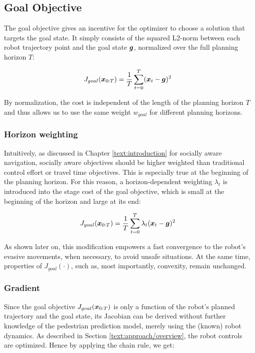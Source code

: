 \subsection{Goal Objective}
\label{text:approach/objective/goal}
The goal objective gives an incentive for the optimizer to choose a solution that targets the goal state. It simply consists of the squared L2-norm between each robot trajectory point and the goal state $\boldsymbol{g}$, normalized over the full planning horizon $T$:

\begin{equation}
J_{goal}(\boldsymbol{x}_{0:T}) = \frac{1}{T} \sum_{t = 0}^T (\boldsymbol{x}_t - \boldsymbol{g})^2
\label{eq:goal_unweighted}
\end{equation}

By normalization, the cost is independent of the length of the planning horizon $T$ and thus allows us to use the same weight $w_{goal}$ for different planning horizons.

\subsubsection{Horizon weighting}
Intuitively, as discussed in Chapter \ref{text:introduction} for socially aware navigation, socially aware objectives should be higher weighted than traditional control effort or travel time objectives. This is especially true at the beginning of the planning horizon. For this reason, a horizon-dependent weighting $\lambda_t$ is introduced into the stage cost of the goal objective, which is small at the beginning of the horizon and large at its end:

\begin{equation}
J_{goal}(\boldsymbol{x}_{0:T}) = \frac{1}{T} \sum_{t = 0}^T \lambda_t (\boldsymbol{x}_t - \boldsymbol{g})^2
\label{eq:goal_weighted}
\end{equation}

As shown later on, this modification empowers a fast convergence to the robot's evasive movements, when necessary, to avoid unsafe situations. At the same time, properties of $J_{goal}(\cdot)$, such as, most importantly, convexity, remain unchanged. 

\subsubsection{Gradient}
Since the goal objective $J_{goal}(\boldsymbol{x}_{0:T})$ is only a function of the robot's planned trajectory and the goal state, its Jacobian can be derived without further knowledge of the pedestrian prediction model, merely using the (known) robot dynamics. As described in Section \ref{text:approach/overview}, the robot controls are optimized. Hence by applying the chain rule, we get:

